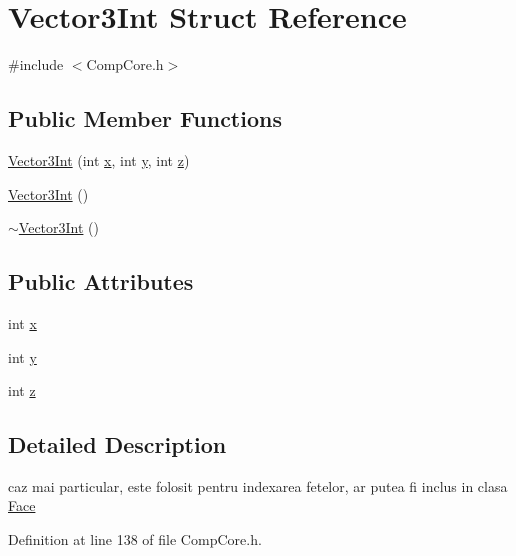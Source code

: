 \hypertarget{struct_vector3_int}{\section{Vector3\-Int Struct Reference}
\label{struct_vector3_int}
}


{\ttfamily \#include $<$Comp\-Core.\-h$>$}

\subsection*{Public Member Functions}
\begin{DoxyCompactItemize}
\item 
\hyperlink{struct_vector3_int_af95dd68c5c8f349b869c08492de527a1}{Vector3\-Int} (int \hyperlink{struct_vector3_int_a8d4ba1800a1912105d9089b54927b3cd}{x}, int \hyperlink{struct_vector3_int_a6d6fcbb9ba302ed0dc3b7ac2752397b3}{y}, int \hyperlink{struct_vector3_int_aa19c7ce5f022b2188c75c23dbd07cb93}{z})
\item 
\hyperlink{struct_vector3_int_a23bcde517cfe932bfae3468452b74986}{Vector3\-Int} ()
\item 
\hyperlink{struct_vector3_int_ad6810122aec8e70357a087f2e27612a1}{$\sim$\-Vector3\-Int} ()
\end{DoxyCompactItemize}
\subsection*{Public Attributes}
\begin{DoxyCompactItemize}
\item 
int \hyperlink{struct_vector3_int_a8d4ba1800a1912105d9089b54927b3cd}{x}
\item 
int \hyperlink{struct_vector3_int_a6d6fcbb9ba302ed0dc3b7ac2752397b3}{y}
\item 
int \hyperlink{struct_vector3_int_aa19c7ce5f022b2188c75c23dbd07cb93}{z}
\end{DoxyCompactItemize}


\subsection{Detailed Description}
caz mai particular, este folosit pentru indexarea fetelor, ar putea fi inclus in clasa \hyperlink{struct_face}{Face} 

Definition at line 138 of file Comp\-Core.\-h.



